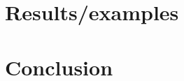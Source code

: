 \documentclass[12pt]{article}
\begin{document}
\section{Results/examples}
\begin{comment}
Can you add whichever theorems you think would be worth discussing in the body of the paper? We can then also add some example graphs to highlight these theorems and to contrast with path verification (either in this or a new or the previous section).
\end{comment}

\section{Conclusion}
\begin{comment}
Still need to decide what we should put here.
\end{comment}

{}


\clearpage
\appendix
\end{document}
